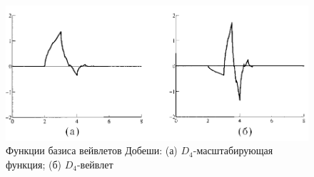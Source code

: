 \begin{figure}[ht]
  \centering
  \includegraphics[scale=0.4]{inc/graphics/d4.png}
  \caption{Функции базиса вейвлетов Добеши: (а) $D_{4}$-масштабирующая функция; (б) $D_{4}$-вейвлет}
  \label{fig:d4}
\end{figure}


